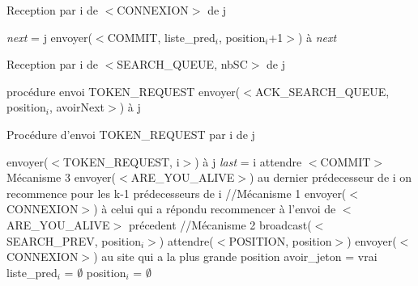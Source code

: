\documentclass[a4paper,12pt]{article}
\newcommand{\last}{\textit{last} }
\newcommand{\next}{\textit{next} }
\begin{document}
\begin{algorithm}[t]
\caption{Reception par i de $<$CONNEXION$>$ de j}
\label{algo_naimi_trehel_amelioration_recpt_CX}
\begin{algorithmic}[1]
\STATE \next = j
\STATE envoyer($<$COMMIT, liste\_pred$_{i}$, position$_{i}$+1$>$) à \next
\end{algorithmic}
\end{algorithm}

\begin{algorithm}[t]
\caption{Reception par i de $<$SEARCH\_QUEUE, nbSC$>$ de j}
\label{algo_naimi_trehel_amelioration_recpt_SQ}
\begin{algorithmic}[1]
  \STATE procédure envoi TOKEN\_REQUEST
\ELSE
    \STATE envoyer($<$ACK\_SEARCH\_QUEUE, position$_{i}$, avoirNext$>$) à j
  \ENDIF  
\ENDIF   
\end{algorithmic}
\end{algorithm}


\begin{algorithm}[t]
\caption{Procédure d'envoi TOKEN\_REQUEST par i de j}
\label{algo_naimi_trehel_amelioration_envoi_TR}
\begin{algorithmic}[1]
\STATE envoyer($<$TOKEN\_REQUEST, i$>$) à j
\IF{j == \last}
  \STATE \last = i
\ENDIF
\STATE attendre $<$COMMIT$>$
  \STATE Mécanisme 3
\ELSE
  \STATE envoyer($<$ARE\_YOU\_ALIVE$>$) au dernier prédecesseur de i
    \STATE on recommence pour les k-1 prédecesseurs de i
  \ENDIF
    \STATE //Mécanisme 1
    \STATE envoyer($<$CONNEXION$>$) à celui qui a répondu
    \STATE recommencer à l'envoi de $<$ARE\_YOU\_ALIVE$>$ précedent
  \ELSE 
    \STATE //Mécanisme 2
    \STATE broadcast($<$SEARCH\_PREV, position$_{i}>$)
    \STATE attendre($<$POSITION, position$>$)
      \STATE envoyer($<$CONNEXION$>$) au site qui a la plus grande position
    \ELSE
      \STATE avoir\_jeton = vrai
      \STATE liste\_pred$_{i}$ = $\emptyset$
      \STATE position$_{i}$ = $\emptyset$
    \ENDIF
  \ENDIF
\ENDIF  
    
\end{algorithmic}
\end{algorithm}
\end{document}
